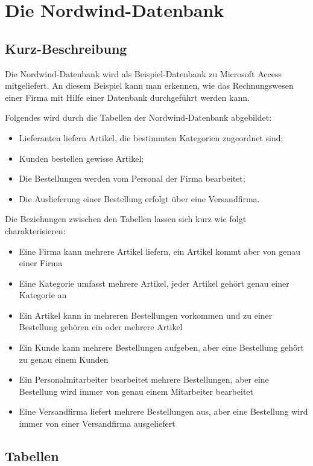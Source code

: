 \setcounter{chapter}{1}
\section*{Die Nordwind-Datenbank}

\subsection*{Kurz-Beschreibung}

Die Nordwind-Datenbank wird als Beispiel-Datenbank zu Microsoft Access mitgeliefert. An diesem Beispiel kann man erkennen, wie das Rechnungswesen einer Firma mit Hilfe einer Datenbank durchgeführt werden kann.

Folgendes wird durch die Tabellen der Nordwind-Datenbank abgebildet:
\begin{itemize}
\item Lieferanten liefern Artikel, die bestimmten Kategorien zugeordnet sind;
\item Kunden bestellen gewisse Artikel;
\item Die Bestellungen werden vom Personal der Firma bearbeitet;
\item Die Auslieferung einer Bestellung erfolgt über eine Versandfirma.
\end{itemize}


Die Beziehungen zwischen den Tabellen lassen sich kurz wie folgt charakterisieren:

\begin{itemize}
\item Eine Firma kann mehrere Artikel liefern, ein Artikel kommt aber von genau einer Firma
\item Eine Kategorie umfasst mehrere Artikel, jeder Artikel gehört genau einer Kategorie an
\item Ein Artikel kann in mehreren Bestellungen vorkommen und zu einer Bestellung gehören ein oder mehrere Artikel
\item Ein Kunde kann mehrere Bestellungen aufgeben, aber eine Bestellung gehört zu genau einem Kunden
\item Ein Personalmitarbeiter bearbeitet mehrere Bestellungen, aber eine Bestellung wird immer von genau einem Mitarbeiter bearbeitet
\item Eine Versandfirma liefert mehrere Bestellungen aus, aber eine Bestellung wird immer von einer Versandfirma ausgeliefert
\end{itemize}

\subsection*{Tabellen}

